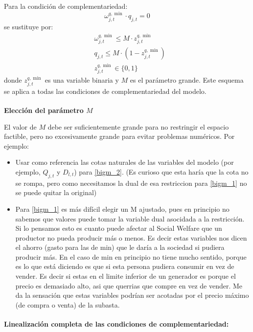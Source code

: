 \documentclass[a4paper,11pt]{article}
\begin{document}
Para la condición de complementariedad:
\[
\omega^{q,\min}_{j,t} \cdot q_{j,t} = 0
\]
se sustituye por:
\begin{align}
    &\omega^{q,\min}_{j,t} \leq M \cdot z^{q,\min}_{j,t} 
    \label{bigm_1}\\
    &q_{j,t} \leq M \cdot (1 - z^{q,\min}_{j,t}) 
    \label{bigm_2}\\
    &z^{q,\min}_{j,t} \in \{0,1\}
\end{align}
donde $z^{q,\min}_{j,t}$ es una variable binaria y $M$ es el parámetro grande. Este esquema se aplica a todas las condiciones de complementariedad del modelo.

\paragraph{}
\textbf{Elección del parámetro $M$}

El valor de $M$ debe ser suficientemente grande para no restringir el espacio factible, pero no excesivamente grande para evitar problemas numéricos. 
Por ejemplo:
\begin{itemize}
    \item Usar como referencia las cotas naturales de las variables del modelo (por ejemplo, $Q_{j,t}$ y $D_{l,t}$) para \ref{bigm_2}. (Es curioso que esta haría que la cota no se rompa, pero como necesitamos la dual de esa restriccion para \ref{bigm_1} no se puede quitar la original)
    \item Para \ref{bigm_1} es más difícil elegir un M ajustado, pues en principio no sabemos que valores puede tomar la variable dual asocidada a la restricción. Si lo pensamos esto es cuanto puede afectar al Social Welfare que un productor no pueda producir más o menos. Es decir estas variables nos dicen el ahorro (gasto para las de min) que le daría a la sociedad si pudiera producir más. En el caso de min en principio no tiene mucho sentido, porque es lo que está diciendo es que si esta persona pudiera consumir en vez de vender. Es decir si estas en el limite inferior de un generador es porque el precio es demasiado alto, asi que querrias que compre en vez de vender. Me da la sensación que estas variables podrían ser acotadas por el precio máximo (de compra o venta) de la subasta.
\end{itemize}

\paragraph{}
\textbf{Linealización completa de las condiciones de complementariedad:}
\end{document}
